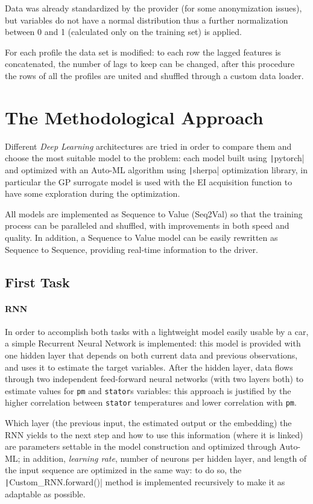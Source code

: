 Data was already standardized by the provider (for some anonymization issues), but variables do not have a normal distribution thus a further normalization between 0 and 1 (calculated only on the training set) is applied.

For each profile the data set is modified: to each row the lagged features is concatenated, the number of lags to keep can be changed, after this procedure the rows of all the profiles are united and shuffled through a custom data loader.

\section{The Methodological Approach}
Different \textit{Deep Learning} architectures are tried in order to compare them and choose the most suitable model to the problem: each model built using \texttt|pytorch| and optimized with an Auto-ML algorithm using \texttt|sherpa| optimization library, in particular the GP surrogate model is used with the EI acquisition function to have some exploration during the optimization.

All models are implemented as Sequence to Value (Seq2Val) so that the training process can be paralleled and shuffled, with improvements in both speed and quality.
In addition, a Sequence to Value model can be easily rewritten as Sequence to Sequence, providing real-time information to the driver.

\subsection{First Task}
\paragraph{RNN}
In order to accomplish both tasks with a lightweight model easily usable by a car, a simple Recurrent Neural Network is implemented: this model is provided with one hidden layer that depends on both current data and previous observations, and uses it to estimate the target variables.
After the hidden layer, data flows through two independent feed-forward neural networks (with two layers both) to estimate values for \verb|pm| and \verb|stator|s variables: this approach is justified by the higher correlation between \verb|stator| temperatures and lower correlation with \verb|pm|.

Which layer (the previous input, the estimated output or the embedding) the RNN yields to the next step and how to use this information (where it is linked) are parameters settable in the model construction and optimized through Auto-ML; in addition, \textit{learning rate}, number of neurons per hidden layer, and length of the input sequence are optimized in the same way: to do so, the \texttt|Custom_RNN.forward()| method is implemented recursively to make it as adaptable as possible.

